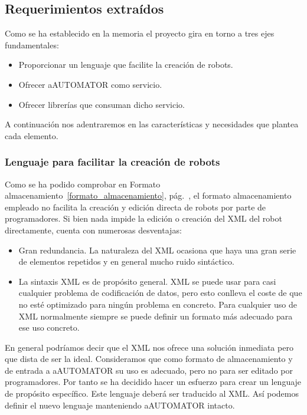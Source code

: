 \subsection{Requerimientos extraídos}

Como se ha establecido en la memoria el proyecto gira en torno a tres
ejes fundamentales:
\begin{itemize}
  \item Proporcionar un lenguaje que facilite la creación de robots.
  \item Ofrecer aAUTOMATOR como servicio.
  \item Ofrecer librerías que consuman dicho servicio.
\end{itemize}

A continuación nos adentraremos en las características y necesidades
que plantea cada elemento.

\subsubsection[Lenguaje robots]{Lenguaje para facilitar la creación de
  robots} Como se ha podido comprobar en Formato
\label{requisitos_lenguaje_robots}
almacenamiento~\ref{formato_almacenamiento},
pág.~\pageref{formato_almacenamiento}, el formato almacenamiento
empleado no facilita la creación y edición directa de robots por parte
de programadores. Si bien nada impide la edición o creación del XML
del robot directamente, cuenta con numerosas desventajas:

\begin{itemize}
  \item Gran redundancia. La naturaleza del XML ocasiona que haya una
    gran serie de elementos repetidos y en general mucho ruido
    sintáctico.
  \item La sintaxis XML es de propósito general. XML se puede usar
    para casi cualquier problema de codificación de datos, pero esto
    conlleva el coste de que no esté optimizado para ningún problema
    en concreto. Para cualquier uso de XML normalmente siempre se puede
    definir un formato más adecuado para ese uso concreto.
\end{itemize}

En general podríamos decir que el XML nos ofrece una solución
inmediata pero que dista de ser la ideal. Consideramos que como
formato de almacenamiento y de entrada a aAUTOMATOR su uso es
adecuado, pero no para ser editado por programadores. Por tanto se ha
decidido hacer un esfuerzo para crear un lenguaje de propósito
específico. Este lenguaje deberá ser traducido al XML. Así podemos
definir el nuevo lenguaje manteniendo aAUTOMATOR intacto.

